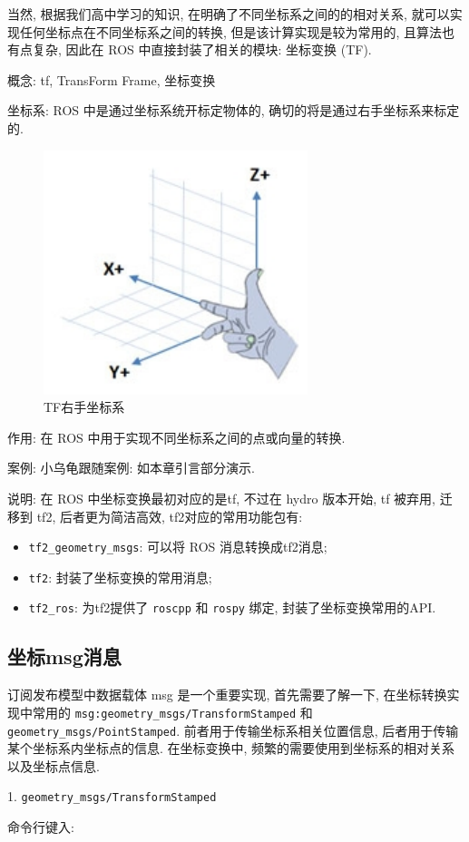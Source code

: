 \documentclass[openany, fontset=windowsold]{ctexbook}
\theoremstyle{kaiti}
\theoremstyle{normal}
\begin{document}
当然, 根据我们高中学习的知识, 在明确了不同坐标系之间的的相对关系, 就可以实现任何坐标点在不同坐标系之间的转换, 但是该计算实现是较为常用的, 且算法也有点复杂, 因此在 ROS 中直接封装了相关的模块: 坐标变换 (TF).

概念: tf, TransForm Frame, 坐标变换

坐标系: ROS 中是通过坐标系统开标定物体的, 确切的将是通过右手坐标系来标定的.

\begin{figure}[!ht]
  \centering
  \includegraphics[width=.3\textwidth]{ros_tf_frame.png}
  \caption{TF右手坐标系}
  \label{fig:ros_tf_frame}
\end{figure}

作用: 在 ROS 中用于实现不同坐标系之间的点或向量的转换.

案例: 小乌龟跟随案例: 如本章引言部分演示.

说明: 在 ROS 中坐标变换最初对应的是tf, 不过在 hydro 版本开始, tf 被弃用, 迁移到 tf2, 后者更为简洁高效, tf2对应的常用功能包有:

\begin{itemize}
  \item \verb|tf2_geometry_msgs|: 可以将 ROS 消息转换成tf2消息;
  \item \verb|tf2|: 封装了坐标变换的常用消息;
  \item \verb|tf2_ros|: 为tf2提供了 \verb|roscpp| 和 \verb|rospy| 绑定, 封装了坐标变换常用的API.
\end{itemize}

\subsection{坐标msg消息}

订阅发布模型中数据载体 msg 是一个重要实现, 首先需要了解一下, 在坐标转换实现中常用的 \verb|msg:geometry_msgs/TransformStamped| 和 \verb|geometry_msgs/PointStamped|. 前者用于传输坐标系相关位置信息, 后者用于传输某个坐标系内坐标点的信息. 在坐标变换中, 频繁的需要使用到坐标系的相对关系以及坐标点信息.

1. \verb|geometry_msgs/TransformStamped|

命令行键入:
\end{document}
